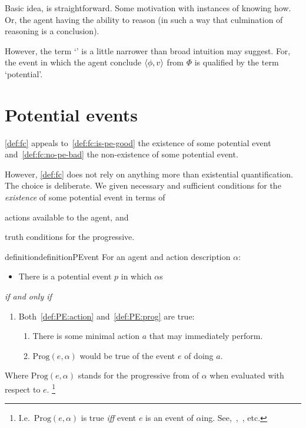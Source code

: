 \begin{note}
  Basic idea, is straightforward.
  Some motivation with instances of knowing how.
  Or, the agent having the ability to reason (in such a way that culmination of reasoning is a conclusion).

  However, the term `' is a little narrower than broad intuition may suggest.
  For, the event in which the agent conclude \(\langle \phi, v \rangle\) from \(\Phi\) is qualified by the term `potential'.
\end{note}

\section{Potential events}
\label{cha:sec:fcs-def:potential-events}

\begin{note}
  \autoref{def:fc} appeals to~\ref{def:fc:is-pe-good} the existence of some potential event and~\ref{def:fc:no-pe-bad} the non-existence of some potential event.

  However, \autoref{def:fc} does not rely on anything more than existential quantification.
  The choice is deliberate.
  We given necessary and sufficient conditions for the \emph{existence} of some potential event in terms of
  \begin{enumerate*}[label=(\roman*)]
  \item
    actions available to the agent, and
  \item
    truth conditions for the progressive.
  \end{enumerate*}

  \begin{restatable}{definition}{definitionPEvent}
    \label{def:potenital-event}
    For an agent \vAgent{} and action description \(\alpha\):
    \begin{itemize}
    \item
      There is a potential event \(p\) in which \vAgent{} \(\alpha\)s
    \end{itemize}
    \emph{if and only if}
    \begin{enumerate}[label=]
    \item
      Both~\ref{def:PE:action} and~\ref{def:PE:prog} are true:
      \begin{enumerate}[label=\alph*., ref=(\alph*)]
      \item
        \label{def:PE:action}
        There is some minimal action \(a\) that \vAgent{} may immediately perform.
      \item
        \label{def:PE:prog}
        \(\text{Prog}(e, \alpha)\) would be true of the  event \(e\) of \vAgent{} doing \(a\).
      \end{enumerate}
    \end{enumerate}
    Where \(\text{Prog}(e, \alpha)\) stands for the progressive from of \(\alpha\) when evaluated with respect to \(e\).%
    \footnote{
      I.e.\ \(\text{Prog}(e, \alpha)\) is true \emph{iff} event \(e\) is an event of \(\alpha\)ing.
      See,~\textcite{Richards:1981wo},~\textcite{Portner:2011vi}, etc.
    }
  \end{restatable}


\end{note}
